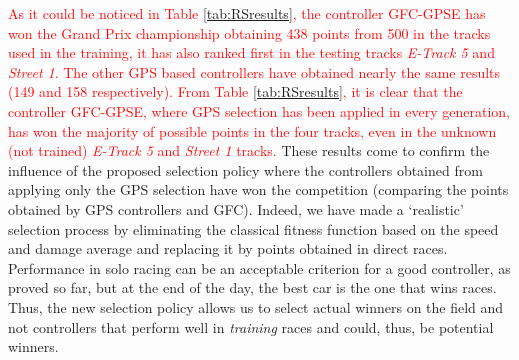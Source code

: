 \documentclass[10pt,journal,compsoc]{IEEEtran}
\begin{document}
%
\textcolor{red}{
As it could be noticed in Table \ref{tab:RSresults}, the controller {\sf GFC-GPSE} has won the Grand Prix championship obtaining 438 points from 500 in the tracks used in the training, it has also ranked first in the testing tracks  \textit{E-Track 5} and \textit{Street 1}. 
The other GPS based controllers have obtained nearly the same results (149 and 158 respectively).
From Table \ref{tab:RSresults}, it is clear that the controller {\sf GFC-GPSE}, where GPS selection has been applied in every generation, has won the majority of possible points in the four tracks, even in the unknown (not trained) \textit{E-Track 5}  and \textit{Street 1} tracks.
}
These results come to confirm the influence of the proposed selection policy where the controllers obtained from applying only the GPS selection have won the competition (comparing the points obtained by GPS controllers and GFC).
Indeed, we have made a `realistic' selection process by eliminating
the classical fitness function based on the speed and damage average
and replacing it by points obtained in direct races. 
Performance in solo racing can be an acceptable criterion for a good
controller, as proved so far, but at the end of the day, the best car
is the one that wins races. Thus, the new selection policy allows us
to select actual winners on the field and not controllers that perform
well in {\em training} races and could, thus, be potential winners.

\end{document}
